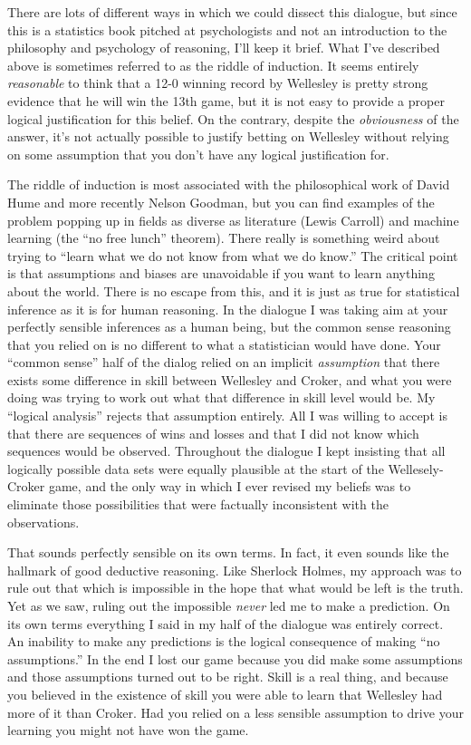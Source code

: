 \documentclass[
]{book}
\begin{document}
There are lots of different ways in which we could dissect this dialogue, but since this is a statistics book pitched at psychologists and not an introduction to the philosophy and psychology of reasoning, I'll keep it brief. What I've described above is sometimes referred to as the riddle of induction. It seems entirely \emph{reasonable} to think that a 12-0 winning record by Wellesley is pretty strong evidence that he will win the 13th game, but it is not easy to provide a proper logical justification for this belief. On the contrary, despite the \emph{obviousness} of the answer, it's not actually possible to justify betting on Wellesley without relying on some assumption that you don't have any logical justification for.

The riddle of induction is most associated with the philosophical work of David Hume and more recently Nelson Goodman, but you can find examples of the problem popping up in fields as diverse as literature (Lewis Carroll) and machine learning (the ``no free lunch'' theorem). There really is something weird about trying to ``learn what we do not know from what we do know.'' The critical point is that assumptions and biases are unavoidable if you want to learn anything about the world. There is no escape from this, and it is just as true for statistical inference as it is for human reasoning. In the dialogue I was taking aim at your perfectly sensible inferences as a human being, but the common sense reasoning that you relied on is no different to what a statistician would have done. Your ``common sense'' half of the dialog relied on an implicit \emph{assumption} that there exists some difference in skill between Wellesley and Croker, and what you were doing was trying to work out what that difference in skill level would be. My ``logical analysis'' rejects that assumption entirely. All I was willing to accept is that there are sequences of wins and losses and that I did not know which sequences would be observed. Throughout the dialogue I kept insisting that all logically possible data sets were equally plausible at the start of the Wellesely-Croker game, and the only way in which I ever revised my beliefs was to eliminate those possibilities that were factually inconsistent with the observations.

That sounds perfectly sensible on its own terms. In fact, it even sounds like the hallmark of good deductive reasoning. Like Sherlock Holmes, my approach was to rule out that which is impossible in the hope that what would be left is the truth. Yet as we saw, ruling out the impossible \emph{never} led me to make a prediction. On its own terms everything I said in my half of the dialogue was entirely correct. An inability to make any predictions is the logical consequence of making ``no assumptions.'' In the end I lost our game because you did make some assumptions and those assumptions turned out to be right. Skill is a real thing, and because you believed in the existence of skill you were able to learn that Wellesley had more of it than Croker. Had you relied on a less sensible assumption to drive your learning you might not have won the game.
\end{document}
